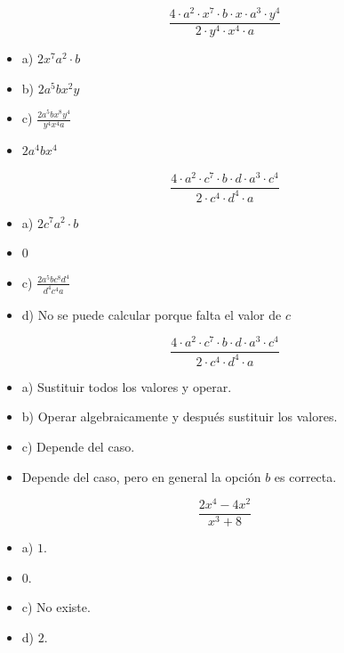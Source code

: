 \[
	\frac{4·a^2·x^7·b·x·a^3·y^4}{2·y^4·x^4·a}
\]

\begin{itemize}
	\item a) $2x^7a^2·b$
	\item b) $2a^5bx^2y$
	\item c) $\frac{2a^5bx^8y^4}{y^4x^4a}$
	\item {} $2a^4bx^4$
\end{itemize}


\[
	\frac{4·a^2·c^7·b·d·a^3·c^4}{2·c^4·d^4·a}
\]

\begin{itemize}
	\item a) $2c^7a^2·b$
	\item {} $0$
	\item c) $\frac{2a^5bc^8d^4}{d^4c^4a}$
	\item d) No se puede calcular porque falta el valor de $c$
\end{itemize}

\[
	\frac{4·a^2·c^7·b·d·a^3·c^4}{2·c^4·d^4·a}
\]

\begin{itemize}
	\item a) Sustituir todos los valores y operar.
	\item b) Operar algebraicamente y después sustituir los valores.
	\item c) Depende del caso.
	\item {} Depende del caso, pero en general la opción $b$ es correcta.
\end{itemize}

\[
	\frac{2x^4-4x^2}{x^3+8}
\]

\begin{itemize}
	\item a) $1$.
	\item {} $0$.
	\item c) No existe.
	\item d) $2$.
\end{itemize}



